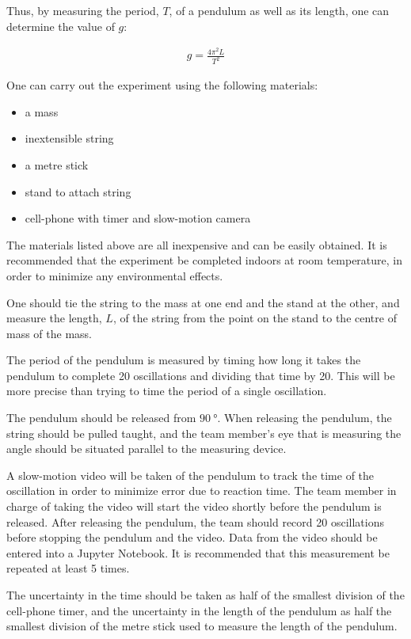Thus, by measuring the period, $T$, of a pendulum as well as its length, one can determine the value of $g$:

\begin{align*}
g=\frac{4\pi^{2}L}{T^{2}}
\end{align*}

One can carry out the experiment using the following materials:
\begin{itemize}
\item a mass
\item inextensible string
\item a metre stick
\item stand to attach string
\item cell-phone with timer and slow-motion camera
\end{itemize}

The materials listed above are all inexpensive and can be easily obtained.  It is recommended that the experiment be completed indoors at room temperature, in order to minimize any environmental effects. 

One should tie the string to the mass at one end and the stand at the other, and measure the length, $L$, of the string from the point on the stand to the centre of mass of the mass.

The period of the pendulum is measured by timing how long it takes the pendulum to complete 20 oscillations and dividing that time by 20. This will be more precise than trying to time the period of a single oscillation.

The pendulum should be released from $\SI{90}{\degree}$. When releasing the pendulum, the string should be pulled taught, and the team member's eye that is measuring the angle should be situated parallel to the measuring device. 

A slow-motion video will be taken of the pendulum to track the time of the oscillation in order to minimize error due to reaction time. The team member in charge of taking the video will start the video shortly before the pendulum is released. After releasing the pendulum, the team should record 20 oscillations before stopping the pendulum and the video. Data from the video should be entered into a Jupyter Notebook. It is recommended that this measurement be repeated at least 5 times.


The uncertainty in the time should be taken as half of the smallest division of the cell-phone timer, and the uncertainty in the length of the pendulum as half the smallest division of the metre stick used to measure the length of the pendulum.

